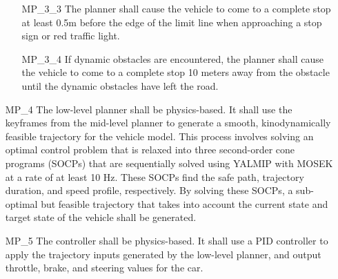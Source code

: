 \begin{itemize}
\begin{itemize}
            \item [MP\_3\_3] The planner shall cause the vehicle to come to a complete stop at least 0.5m before the edge of the limit line when approaching a stop sign or red traffic light.
            \item [MP\_3\_4] If dynamic obstacles are encountered, the planner shall cause the vehicle to come to a complete stop 10 meters away from the obstacle until the dynamic obstacles have left the road.
        \end{itemize}
        \item[MP\_4] The low-level planner shall be physics-based. It shall use the keyframes from the mid-level planner to generate a smooth, kinodynamically feasible trajectory for the vehicle model. This process involves solving an optimal control problem that is relaxed into three second-order cone programs (SOCPs) that are sequentially solved using YALMIP with MOSEK at a rate of at least 10 Hz. These SOCPs find the safe path, trajectory duration, and speed profile, respectively. By solving these SOCPs, a sub-optimal but feasible trajectory that takes into account the current state and target state of the vehicle shall be generated.
        
        \item[MP\_5] The controller shall be physics-based. It shall use a PID controller to apply the trajectory inputs generated by the low-level planner, and output throttle, brake, and steering values for the car.
    \end{itemize}